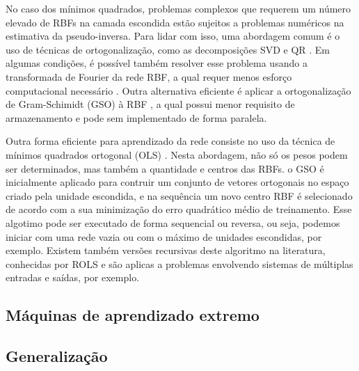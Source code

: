 \documentclass[conference]{IEEEtran}
\begin{document}
	No caso dos mínimos quadrados, problemas complexos que requerem um número elevado de RBFs na camada escondida estão sujeitos a problemas numéricos na estimativa da pseudo-inversa. Para lidar com isso, uma abordagem comum é o uso de técnicas de ortogonalização, como as decomposições SVD e QR \cite{golub1980analysis}. Em algumas condições, é possível também resolver esse problema usando a transformada de Fourier da rede RBF, a qual requer menos esforço computacional necessário \cite{abe2003fast}. Outra alternativa eficiente é aplicar a ortogonalização de Gram-Schimidt (GSO) à RBF \cite{kaminski1997kernel}, a qual possui menor requisito de armazenamento e pode sem implementado de forma paralela.
	
	Outra forma eficiente para aprendizado da rede consiste no uso da técnica de mínimos quadrados ortogonal (OLS) \cite{chen1991orthogonal, chen1992orthogonal, chen1995fast, hong1997givens}. Nesta abordagem, não só os pesos podem ser determinados, mas também a quantidade e centros das RBFs. o GSO é inicialmente aplicado para contruir um conjunto de vetores ortogonais no espaço criado pela unidade escondida, e na sequência um novo centro RBF é selecionado de acordo com a sua minimização do erro quadrático médio de treinamento. Esse algotimo pode ser executado de forma sequencial ou reversa, ou seja, podemos iniciar com uma rede vazia ou com o máximo de unidades escondidas, por exemplo. Existem também versões recursivas deste algoritmo na literatura, conhecidas por ROLS \cite{yu1997recursive} e são aplicas a problemas envolvendo sistemas de múltiplas entradas e saídas, por exemplo.
	
	
	
	\subsection{Máquinas de aprendizado extremo}
	
	
	
	
	
	
	
	\subsection{Generalização}
		
\end{document}
